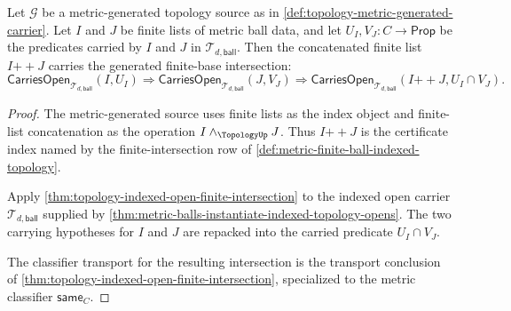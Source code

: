 \begin{theorem}
\label{thm:topology-metric-base-intersection}
Let $\mathcal{G}$ be a metric-generated topology source as in \autoref{def:topology-metric-generated-carrier}. Let $I$ and $J$ be finite lists of metric ball data, and let $U_I,V_J:C\to\mathsf{Prop}$ be the predicates carried by $I$ and $J$ in $\mathcal{T}_{d,\mathsf{ball}}$. Then the concatenated finite list $I\mathbin{+\!\!+}J$ carries the generated finite-base intersection:
$$
\mathsf{CarriesOpen}_{\mathcal{T}_{d,\mathsf{ball}}}(I,U_I)
\Longrightarrow
\mathsf{CarriesOpen}_{\mathcal{T}_{d,\mathsf{ball}}}(J,V_J)
\Longrightarrow
\mathsf{CarriesOpen}_{\mathcal{T}_{d,\mathsf{ball}}}
(I\mathbin{+\!\!+}J,U_I\cap V_J).
$$
\end{theorem}
\begin{proof}
The metric-generated source uses finite lists as the index object and finite-list concatenation as the operation $I\wedge_{\TopologyUp}J$. Thus $I\mathbin{+\!\!+}J$ is the certificate index named by the finite-intersection row of \autoref{def:metric-finite-ball-indexed-topology}.

Apply \autoref{thm:topology-indexed-open-finite-intersection} to the indexed open carrier $\mathcal{T}_{d,\mathsf{ball}}$ supplied by \autoref{thm:metric-balls-instantiate-indexed-topology-opens}. The two carrying hypotheses for $I$ and $J$ are repacked into the carried predicate $U_I\cap V_J$.

The classifier transport for the resulting intersection is the transport conclusion of \autoref{thm:topology-indexed-open-finite-intersection}, specialized to the metric classifier $\mathsf{same}_C$.
\end{proof}

